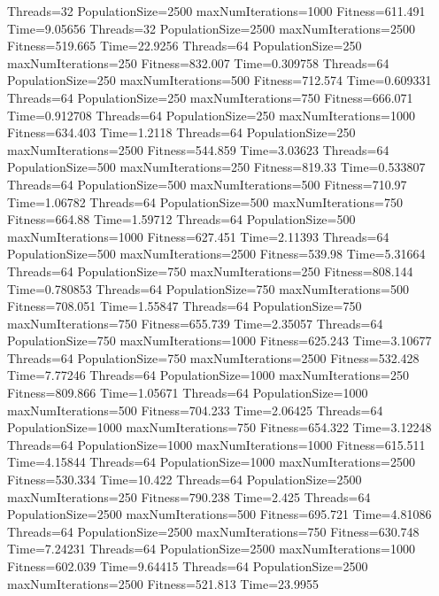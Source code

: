 \documentclass[10pt,letterpaper]{article}
\begin{document}
Threads=32 PopulationSize=2500 maxNumIterations=1000 Fitness=611.491 Time=9.05656
Threads=32 PopulationSize=2500 maxNumIterations=2500 Fitness=519.665 Time=22.9256
Threads=64 PopulationSize=250 maxNumIterations=250 Fitness=832.007 Time=0.309758
Threads=64 PopulationSize=250 maxNumIterations=500 Fitness=712.574 Time=0.609331
Threads=64 PopulationSize=250 maxNumIterations=750 Fitness=666.071 Time=0.912708
Threads=64 PopulationSize=250 maxNumIterations=1000 Fitness=634.403 Time=1.2118
Threads=64 PopulationSize=250 maxNumIterations=2500 Fitness=544.859 Time=3.03623
Threads=64 PopulationSize=500 maxNumIterations=250 Fitness=819.33 Time=0.533807
Threads=64 PopulationSize=500 maxNumIterations=500 Fitness=710.97 Time=1.06782
Threads=64 PopulationSize=500 maxNumIterations=750 Fitness=664.88 Time=1.59712
Threads=64 PopulationSize=500 maxNumIterations=1000 Fitness=627.451 Time=2.11393
Threads=64 PopulationSize=500 maxNumIterations=2500 Fitness=539.98 Time=5.31664
Threads=64 PopulationSize=750 maxNumIterations=250 Fitness=808.144 Time=0.780853
Threads=64 PopulationSize=750 maxNumIterations=500 Fitness=708.051 Time=1.55847
Threads=64 PopulationSize=750 maxNumIterations=750 Fitness=655.739 Time=2.35057
Threads=64 PopulationSize=750 maxNumIterations=1000 Fitness=625.243 Time=3.10677
Threads=64 PopulationSize=750 maxNumIterations=2500 Fitness=532.428 Time=7.77246
Threads=64 PopulationSize=1000 maxNumIterations=250 Fitness=809.866 Time=1.05671
Threads=64 PopulationSize=1000 maxNumIterations=500 Fitness=704.233 Time=2.06425
Threads=64 PopulationSize=1000 maxNumIterations=750 Fitness=654.322 Time=3.12248
Threads=64 PopulationSize=1000 maxNumIterations=1000 Fitness=615.511 Time=4.15844
Threads=64 PopulationSize=1000 maxNumIterations=2500 Fitness=530.334 Time=10.422
Threads=64 PopulationSize=2500 maxNumIterations=250 Fitness=790.238 Time=2.425
Threads=64 PopulationSize=2500 maxNumIterations=500 Fitness=695.721 Time=4.81086
Threads=64 PopulationSize=2500 maxNumIterations=750 Fitness=630.748 Time=7.24231
Threads=64 PopulationSize=2500 maxNumIterations=1000 Fitness=602.039 Time=9.64415
Threads=64 PopulationSize=2500 maxNumIterations=2500 Fitness=521.813 Time=23.9955
\end{document}
